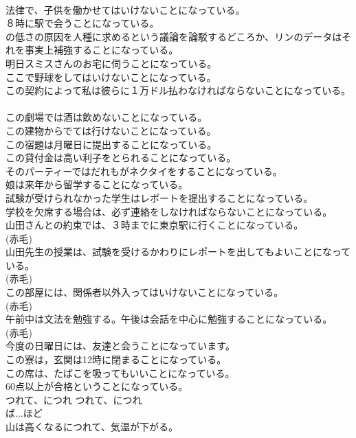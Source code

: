 \documentclass[8pt]{extreport}
\begin{document}
\begin{CJK}{UTF8}{min}
\\	法律で、子供を働かせてはいけないことになっている。  
\\	８時に駅で会うことになっている。   
\\	の低さの原因を人種に求めるという議論を論駁するどころか、リンのデータはそれを事実上補強することになっている。   
\\	明日スミスさんのお宅に伺うことになっている。  
\\	ここで野球をしてはいけないことになっている。   
\\	この契約によって私は彼らに１万ドル払わなければならないことになっている。   
\\	この劇場では酒は飲めないことになっている。   
\\	この建物からでては行けないことになっている。   
\\	この宿題は月曜日に提出することになっている。   
\\	この貸付金は高い利子をとられることになっている。   
\\	そのパーティーではだれもがネクタイをすることになっている。  
\\	娘は来年から留学することになっている。  
\\	試験が受けられなかった学生はレポートを提出することになっている。  
\\	学校を欠席する場合は、必ず連絡をしなければならないことになっている。  
\\	山田さんとの約束では、３時までに東京駅に行くことになっている。  
\\	(赤毛)
\\	山田先生の授業は、試験を受けるかわりにレポートを出してもよいことになっている。  
\\	(赤毛)
\\	この部屋には、関係者以外入ってはいけないことになっている。  
\\	(赤毛)
\\	午前中は文法を勉強する。午後は会話を中心に勉強することになっている。  
\\	(赤毛)
\\	今度の日曜日には、友達と会うことになっています。  
\\	この寮は，玄関は12時に閉まることになっている。  
\\	この席は、たばこを吸ってもいいことになっている。  
\\	60点以上が合格ということになっている。  
\\	つれて、につれ	つれて、につれ	
\\	ば...ほど	
\\	山は高くなるにつれて、気温が下がる。  

\end{CJK}
\end{document}
